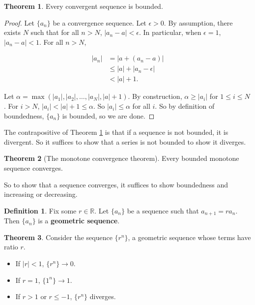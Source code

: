 \documentclass{article}
\theoremstyle{definition}
\newtheorem{definition}{Definition}[section]
\newtheorem{theorem}{Theorem}[section]
\begin{document}
\begin{theorem} \label{convergent-bounded}
Every convergent sequence is bounded.
\end{theorem}

\begin{proof}
Let $\{a_n\}$ be a convergence sequence. Let $\epsilon > 0$. By assumption, there exists $N$ such that for all $n > N$, $|a_n - a| < \epsilon$. In particular, when $\epsilon = 1$, $|a_n - a| < 1$. For all $n > N$, 

\begin{align}
|a_n| & = |a + (a_n - a)| \\
& \leq |a| + |a_n - \epsilon| \\
& < |a| + 1.
\end{align}

Let $\alpha = \max(|a_1|, |a_2|, \ldots, |a_N|, |a| + 1)$. By construction, $\alpha \geq |a_i|$ for $1 \leq i \leq N$. For $i > N$, $|a_i| < |a| + 1 \leq \alpha$. So $|a_i| \leq \alpha$ for all $i$. So by definition of boundedness, $\{a_n\}$ is bounded, so we are done.
\end{proof}

The contrapositive of Theorem \ref{convergent-bounded} is that if a sequence is not bounded, it is divergent. So it suffices to show that a series is not bounded to show it diverges.

\begin{theorem}[The monotone convergence theorem]
Every bounded monotone sequence converges.
\end{theorem}

So to show that a sequence converges, it suffices to show boundedness and increasing or decreasing.

\begin{definition}
Fix some $r \in \mathbb{R}$. Let $\{a_n\}$ be a sequence such that $a_{n+1} = ra_n$. Then $\{a_n\}$ is a \textbf{geometric sequence}.
\end{definition}

\begin{theorem}
Consider the sequence $\{r^n\}$, a geometric sequence whose terms have ratio $r$. 

\begin{itemize}
\item If $|r| < 1$, $\{r^n\} \to 0$.
\item If $r = 1$, $\{1^n\} \to 1$.
\item If $r > 1$ or $r \leq -1$, $\{r^n\}$ diverges.
\end{itemize}

\end{theorem}
\end{document}
